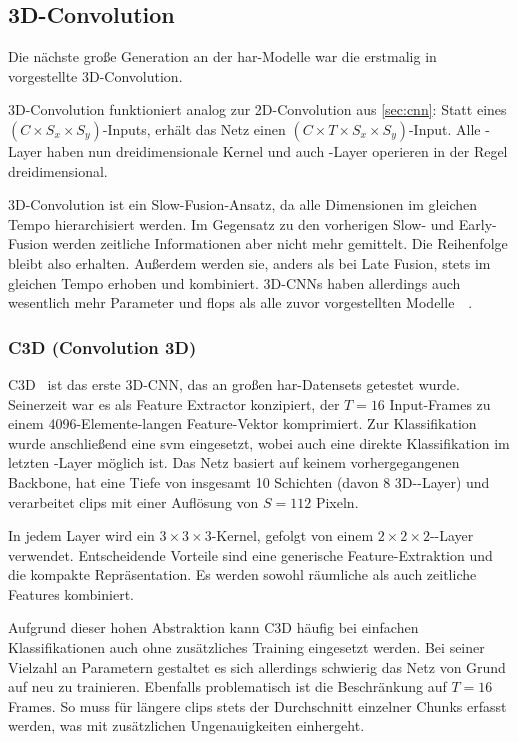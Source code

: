 \subsection{3D-Convolution}
\label{subsec:3d-conv}

Die nächste große Generation an der \gls{har}-Modelle war die erstmalig in~\cite{Ji13} vorgestellte 3D-Convolution.

3D-Convolution funktioniert analog zur 2D-Convolution aus \autoref{sec:cnn}:
Statt eines $(C \times S_x \times S_y)$-Inputs, erhält das Netz einen $(C \times T \times S_x \times S_y)$-Input.
Alle \conv-Layer haben nun dreidimensionale Kernel und auch \pool-Layer operieren in der Regel dreidimensional.

3D-Convolution ist ein Slow-Fusion-Ansatz, da alle Dimensionen im gleichen Tempo hierarchisiert werden.
Im Gegensatz zu den vorherigen Slow- und Early-Fusion werden zeitliche Informationen aber nicht mehr gemittelt.
Die Reihenfolge bleibt also erhalten.
Außerdem werden sie, anders als bei Late Fusion, stets im gleichen Tempo erhoben und kombiniert.
3D-CNNs haben allerdings auch wesentlich mehr Parameter und \gls{flops} als alle zuvor vorgestellten Modelle~\cite{Zhu19}~\cite{Carreira17}.

\subsubsection*{C3D (Convolution 3D)}

C3D~\cite{Tran15} ist das erste 3D-CNN, das an großen \gls{har}-Datensets getestet wurde.
Seinerzeit war es als Feature Extractor konzipiert, der $T=16$ Input-Frames zu einem 4096-Elemente-langen Feature-Vektor komprimiert.
Zur Klassifikation wurde anschließend eine \gls{svm} eingesetzt, wobei auch eine direkte Klassifikation im letzten \fc-Layer möglich ist.
Das Netz basiert auf keinem vorhergegangenen Backbone, hat eine Tiefe von insgesamt 10 Schichten (davon 8 3D-\conv-Layer) und verarbeitet \glspl{clip} mit einer Auflösung von $S=112$ Pixeln.

In jedem Layer wird ein $3 \times 3 \times 3$-Kernel, gefolgt von einem $2 \times 2 \times 2$-\pool-Layer verwendet.
Entscheidende Vorteile sind eine generische Feature-Extraktion und die kompakte Repräsentation.
Es werden sowohl räumliche als auch zeitliche Features kombiniert.

Aufgrund dieser hohen Abstraktion kann C3D häufig bei einfachen Klassifikationen auch ohne zusätzliches Training eingesetzt werden.
Bei seiner Vielzahl an Parametern gestaltet es sich allerdings schwierig das Netz von Grund auf neu zu trainieren.
Ebenfalls problematisch ist die Beschränkung auf $T=16$ Frames.
So muss für längere \glspl{clip} stets der Durchschnitt einzelner Chunks erfasst werden, was mit zusätzlichen Ungenauigkeiten einhergeht.

